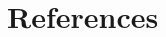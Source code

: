 \section{References}
\begin{multicols}{3}
	
	
	\columnbreak
	
	
	
	\columnbreak
	
		
\end{multicols}